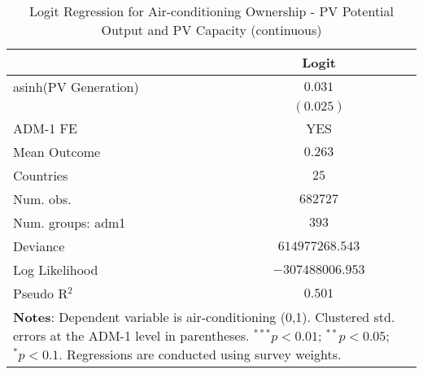 
\begin{table}[H]
\caption{Logit Regression for Air-conditioning Ownership - PV Potential Output and PV Capacity (continuous)}
\begin{center}
\begin{tabular}{l c}
\hline
 & Logit \\
\hline
asinh(PV Generation) & $0.031$          \\
                     & $(0.025)$        \\
\hline
ADM-1 FE             & YES              \\
Mean Outcome         & $0.263$          \\
Countries            & $25$             \\
Num. obs.            & $682727$         \\
Num. groups: adm1    & $393$            \\
Deviance             & $614977268.543$  \\
Log Likelihood       & $-307488006.953$ \\
Pseudo R$^2$         & $0.501$          \\
\hline
\multicolumn{2}{l}{\scriptsize{\textbf{Notes}: Dependent variable is air-conditioning (0,1). Clustered std. errors at the ADM-1 level in parentheses. $^{***}p<0.01$; $^{**}p<0.05$; $^{*}p<0.1$. Regressions are conducted using survey weights.}}
\end{tabular}
\label{main: tableA14}
\end{center}
\end{table}
